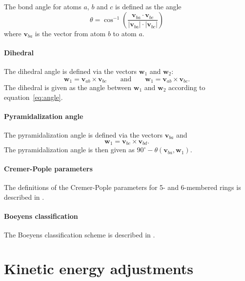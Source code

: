 \documentclass[a4paper,11pt,DIV=15,openany,twoside=false]{scrbook}
\newcommand{\VEC}[1]{\ensuremath{\mathbf{#1}}}
\begin{document}
The bond angle for atoms $a$, $b$ and $c$ is defined as the angle
\begin{equation}
  \theta=
  \cos^{-1}\left(
    \frac{\VEC{v}_{ba}\cdot\VEC{v}_{bc}}{|\VEC{v}_{ba}|\cdot|\VEC{v}_{bc}|}
  \right)\label{eq:angle}
\end{equation}
where $\VEC{v}_{ba}$ is the vector from atom $b$ to atom $a$.

\paragraph{Dihedral}

The dihedral angle is defined via the vectors $\VEC{w}_1$ and $\VEC{w}_2$:
\begin{equation}
  \VEC{w}_1=\VEC{v}_{ab}\times\VEC{v}_{bc}\qquad\text{and}\qquad\VEC{w}_1=\VEC{v}_{ab}\times\VEC{v}_{bc}.
\end{equation}
The dihedral is given as the angle between $\VEC{w}_1$ and $\VEC{w}_2$ according to equation~\eqref{eq:angle}.

\paragraph{Pyramidalization angle}

The pyramidalization angle is defined via the vectors $\VEC{v}_{ba}$ and 
\begin{equation}
  \VEC{w}_1=\VEC{v}_{bc}\times\VEC{v}_{bd}.
\end{equation}
The pyramidalization angle is then given as $90^\circ - \theta(\VEC{v}_{ba},\VEC{w}_1)$.

\paragraph{Cremer-Pople parameters}

The definitions of the Cremer-Pople parameters for 5- and 6-membered rings is described in \cite{Cremer1975JACS}.

\paragraph{Boeyens classification}

The Boeyens classification scheme is described in \cite{Boeyens1976JCMS}.

\section{Kinetic energy adjustments}\label{met:ekinadj}
\end{document}
